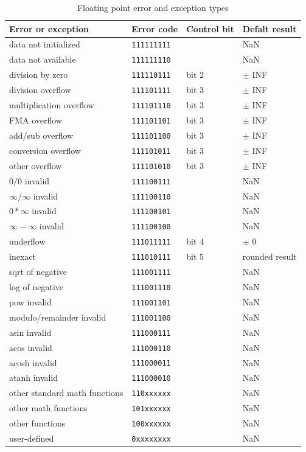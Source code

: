 \documentclass[forwardcom.tex]{subfiles}
\begin{document}
\begin{longtable}
{|p{53mm}|p{28mm}|p{15mm}|p{26mm}|}
\caption{Floating point error and exception types}
\label{table:FPErrorTypes}
\endfirsthead
\endhead
\hline
\bfseries Error or exception & \bfseries Error code & \bfseries Control bit & \bfseries Defalt result \\ \hline

data not initialized      & \texttt{111111111} &       &  NaN \\
data not available        & \texttt{111111110} &       &  NaN \\
division by zero          & \texttt{111110111} & bit 2 & $\pm$ INF \\
division overflow         & \texttt{111101111} & bit 3 & $\pm$ INF \\
multiplication overflow   & \texttt{111101110} & bit 3 & $\pm$ INF \\
FMA overflow              & \texttt{111101101} & bit 3 & $\pm$ INF \\
add/sub overflow          & \texttt{111101100} & bit 3 & $\pm$ INF \\
conversion overflow       & \texttt{111101011} & bit 3 & $\pm$ INF \\
other overflow            & \texttt{111101010} & bit 3 & $\pm$ INF \\
$0 / 0$ invalid           & \texttt{111100111} & & NaN \\
$\infty / \infty$ invalid & \texttt{111100110} & & NaN \\
$0 * \infty$ invalid      & \texttt{111100101} & & NaN \\
$\infty - \infty$ invalid & \texttt{111100100} & & NaN \\
underflow                 & \texttt{111011111} & bit 4 & $\pm$ 0 \\
inexact                   & \texttt{111010111} & bit 5 & rounded result \\
sqrt of negative          & \texttt{111001111} &  & NaN \\
log of negative           & \texttt{111001110} &  & NaN \\
pow invalid               & \texttt{111001101} &  & NaN \\
modulo/remainder invalid  & \texttt{111001100} &  & NaN \\
asin invalid              & \texttt{111000111} &  & NaN \\
acos invalid              & \texttt{111000110} &  & NaN \\
acosh invalid             & \texttt{111000011} &  & NaN \\
atanh invalid             & \texttt{111000010} &  & NaN \\

other standard math functions  & \texttt{110xxxxxx} &  & NaN \\
other math functions      & \texttt{101xxxxxx} &  & NaN \\
other functions           & \texttt{100xxxxxx} &  & NaN \\
user-defined  & \texttt{0xxxxxxxx} &  & NaN \\
\hline
\end{longtable}
\vv
\end{document}
